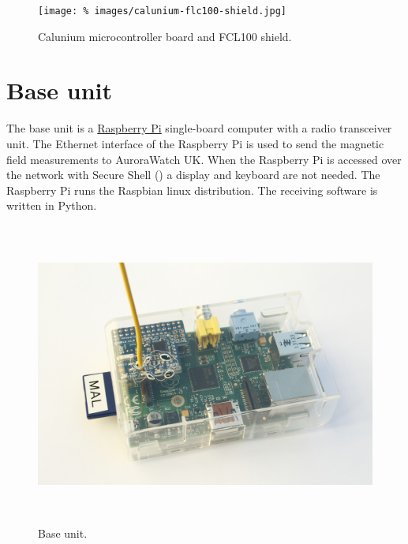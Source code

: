 \begin{figure}
  \centering
  \texttt{[image: \%
    images/calunium-flc100-shield.jpg]}
  \caption[Calunium microcontroller board and FCL100 shield]{%
    Calunium microcontroller board and FCL100 shield. 
    }
  \label{fig:calunium-flc-100-shield}
\end{figure}

\clearpage
\section{Base unit}

The base unit is a \href{http://www.raspberrypi.org/‎}{Raspberry Pi}
single-board computer with a radio transceiver unit. The Ethernet
interface of the Raspberry Pi is used to send the magnetic field
measurements to AuroraWatch UK. When the Raspberry Pi is accessed over
the network with Secure Shell (\ssh) a display and keyboard are not
needed. The Raspberry Pi runs the Raspbian linux distribution. The
receiving software is written in Python.

\begin{figure}[!h]
  \centering
  \includegraphics[keepaspectratio,height=10cm]{images/base-unit}
  \caption[Base unit]{%
    Base unit. }
  \label{fig:base-unit}
\end{figure}
